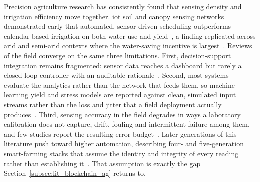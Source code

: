 \documentclass[12pt,a4paper,oneside]{book}
\begin{document}
Precision agriculture research has consistently found that sensing density
and irrigation efficiency move together. \gls{iot} soil and canopy sensing
networks demonstrated early that automated, sensor-driven scheduling
outperforms calendar-based irrigation on both water use and
yield~\cite{rathi2025smart, brooks2019precisionWater, chatterjee2023precision, gondchawar2016agriculture4}, a finding replicated across arid and
semi-arid contexts where the water-saving incentive is
largest~\cite{williams2022savings, miller2020climateImpact, garrido2018mediterranean}. Reviews of the field converge on the same three
limitations. First, decision-support integration remains
fragmented: sensor data reaches a dashboard but rarely a closed-loop
controller with an auditable
rationale~\cite{aydin2021comprehensive, zhang2002precision, gebbers2010precision, mcbratney2005future}. Second, most systems evaluate
the analytics rather than the network that feeds them, so machine-learning
yield and stress models are reported against clean, simulated input streams
rather than the loss and jitter that a field deployment actually
produces~\cite{chlingaryan2018machine, goap2018iot, mohanty2016using, van2020review}. Third, sensing accuracy in the field degrades in ways a
laboratory calibration does not capture, drift, fouling and intermittent
failure among them, and few studies report the resulting error
budget~\cite{akhtar2019sensingAccuracy, agri2024sensorAccuracy, garcia2021sensorFailures, lopez2023remoteFailure}. Later generations of this
literature push toward higher automation, describing four- and
five-generation smart-farming stacks that assume the identity and integrity
of every reading rather than establishing
it~\cite{suleiman2025agriculture5, owusu2025iotAgri, yang2021iotSensing, singh2019iotSmartIrrigation, jin2025productivity}. That assumption is exactly
the gap Section~\ref{subsec:lit_blockchain_ag} returns to.

\label{subsec:lit_lpwan}
\end{document}
